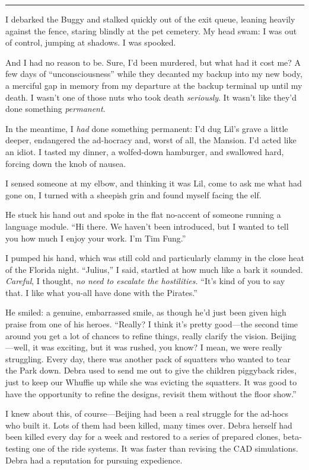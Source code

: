 \begin{center}\rule{3in}{0.4pt}\end{center}

I debarked the Buggy and stalked quickly out of the exit queue,
leaning heavily against the fence, staring blindly at the pet
cemetery. My head swam: I was out of control, jumping at shadows. I
was spooked.

And I had no reason to be. Sure, I'd been murdered, but what had it
cost me? A few days of “unconsciousness” while they decanted my
backup into my new body, a merciful gap in memory from my departure
at the backup terminal up until my death. I wasn't one of those
nuts who took death \emph{seriously}. It wasn't like they'd done
something \emph{permanent}.

In the meantime, I \emph{had} done something permanent: I'd dug
Lil's grave a little deeper, endangered the ad-hocracy and, worst
of all, the Mansion. I'd acted like an idiot. I tasted my dinner, a
wolfed-down hamburger, and swallowed hard, forcing down the knob of
nausea.

I sensed someone at my elbow, and thinking it was Lil, come to ask
me what had gone on, I turned with a sheepish grin and found myself
facing the elf.

He stuck his hand out and spoke in the flat no-accent of someone
running a language module. “Hi there. We haven't been introduced,
but I wanted to tell you how much I enjoy your work. I'm Tim
Fung.”

I pumped his hand, which was still cold and particularly clammy in
the close heat of the Florida night. “Julius,” I said, startled at
how much like a bark it sounded. \emph{Careful}, I thought,
\emph{no need to escalate the hostilities.} “It's kind of you to
say that. I like what you-all have done with the Pirates.”

He smiled: a genuine, embarrassed smile, as though he'd just been
given high praise from one of his heroes. “Really? I think it's
pretty good—the second time around you get a lot of chances to
refine things, really clarify the vision. Beijing—well, it was
exciting, but it was rushed, you know? I mean, we were really
struggling. Every day, there was another pack of squatters who
wanted to tear the Park down. Debra used to send me out to give the
children piggyback rides, just to keep our Whuffie up while she was
evicting the squatters. It was good to have the opportunity to
refine the designs, revisit them without the floor show.”

I knew about this, of course—Beijing had been a real struggle for
the ad-hocs who built it. Lots of them had been killed, many times
over. Debra herself had been killed every day for a week and
restored to a series of prepared clones, beta-testing one of the
ride systems. It was faster than revising the CAD simulations.
Debra had a reputation for pursuing expedience.

